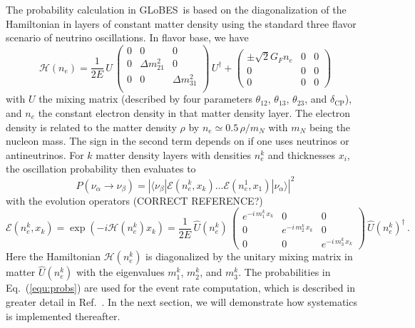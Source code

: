 \documentclass[12pt,a4paper]{article}
\newcommand{\eq}{Eq.}
\newcommand{\Ref}{Ref.}
\newcommand{\ldm}{\Delta m_{31}^2}
\newcommand{\sdm}{\Delta m_{21}^2}
\newcommand{\deltacp}{\delta_{\mathrm{CP}}}
\newcommand{\GLOBES}{{\sf GLoBES}}
\newcommand{\equ}[1]{\eq~(\ref{equ:#1})}
\begin{document}
The probability calculation in \GLOBES\ is based on the diagonalization of the
Hamiltonian in layers of constant matter density using the standard three flavor
scenario of neutrino oscillations. In flavor base, we have
\begin{equation}
\mathcal{H}(n_e) = \frac{1}{2E} \, U \,
\left(
\begin{array}{ccc}
0 & 0 & 0 \\
0  & \sdm & 0 \\
0  & 0 & \ldm \\
\end{array}
\right) \,
U^\dagger + 
\left(
\begin{array}{ccc}
 \pm \sqrt{2} G_F n_e & 0 & 0 \\
0 & 0 & 0 \\
0 & 0 & 0 
\end{array}
\right)
\label{equ:ham}
\end{equation}
with $U$ the mixing matrix (described by four parameters $\theta_{12}$, $\theta_{13}$, $\theta_{23}$, and $\deltacp$), and $n_e$ the constant electron density
in that matter density layer. The electron density is related to the matter density $\rho$ by 
$n_e \simeq 0.5 \, \rho/m_N$ with $m_N$ being the nucleon mass. The sign in the second term depends on if one
uses neutrinos or antineutrinos. For $k$ matter density layers with densities
$n^k_e$ and thicknesses $x_i$, the oscillation probability then evaluates to
\begin{equation}
P(\nu_\alpha \rightarrow \nu_\beta) = \left| \langle \nu_\beta | \mathcal{E}(n^k_e, x_k) \hdots  \mathcal{E}(n^1_e, x_1) | \nu_\alpha \rangle \right|^2
\label{equ:probs}
\end{equation}
with the evolution operators (CORRECT REFERENCE?)
\begin{equation}
  \mathcal{E}(n^k_e, x_k) = \exp \left( -i \mathcal{H}(n^k_e) x_k \right) = \frac{1}{2E} \, \hat{U}(n^k_e) \, \left( \begin{array}{ccc}
e^{-i \, m_1^k \, x_k} & 0 & 0 \\
0 &  e^{-i \, m_2^k \, x_k} & 0 \\
0 & 0 & e^{-i \, m_3^k \, x_k} 
\end{array}
\right) \, \hat{U}(n^k_e)^\dagger \, .
\end{equation}
Here the Hamiltonian $\mathcal{H}(n^k_e)$ is diagonalized by the unitary mixing matrix in matter $\hat{U}(n^k_e)$
with the eigenvalues $m_1^k$, $m_2^k$, and $m_3^k$. The probabilities in \equ{probs} are used for the
event rate computation, which is described in greater detail in \Ref~\cite{Huber:2004ka}. In the next section,
we will demonstrate how systematics is implemented thereafter.
\end{document}

